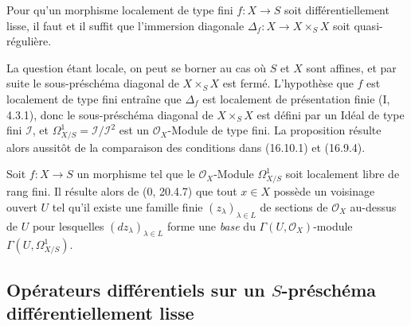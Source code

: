 \begin{proposition}[16.10.5]
\label{IV.16.10.5}
Pour qu'un morphisme localement de type fini $f:X\to S$ soit
différentiellement lisse, il faut et il suffit que l'immersion diagonale
$\Delta_f:X\to X\times_S X$ soit quasi-régulière.
\end{proposition}


La question étant locale, on peut se borner au cas où $S$ et $X$ sont
affines, et par suite le sous-préschéma diagonal de $X\times_S X$ est fermé.
L'hypothèse que $f$ est localement de type fini entraîne que $\Delta_f$ est
localement de présentation finie (I, 4.3.1), donc le sous-préschéma diagonal
de $X\times_S X$ est défini par un Idéal de type fini $\mathscr{I}$, et
$\Omega_{X/S}^1=\mathscr{I}/\mathscr{I}^2$ est un $\mathcal{O}_X$-Module de
type fini. La proposition résulte alors aussitôt de la comparaison des
conditions dans (16.10.1) et (16.9.4).

\begin{remark}[16.10.6]
\label{IV.16.10.6}
Soit $f:X\to S$ un morphisme tel que le $\mathcal{O}_X$-Module
$\Omega_{X/S}^1$ soit localement libre de rang fini. Il résulte alors de
(0, 20.4.7) que tout $x\in X$ possède un voisinage ouvert $U$ tel qu'il existe
une famille finie $(z_\lambda)_{\lambda\in L}$ de sections de
$\mathcal{O}_X$ au-dessus de $U$ pour lesquelles $(dz_\lambda)_{\lambda\in L}$
forme une \emph{base} du $\Gamma(U,\mathcal{O}_X)$-module
$\Gamma(U,\Omega_{X/S}^1)$.
\end{remark}

\subsection{Opérateurs différentiels sur un $S$-préschéma différentiellement
lisse}
\label{IV.16.11}

